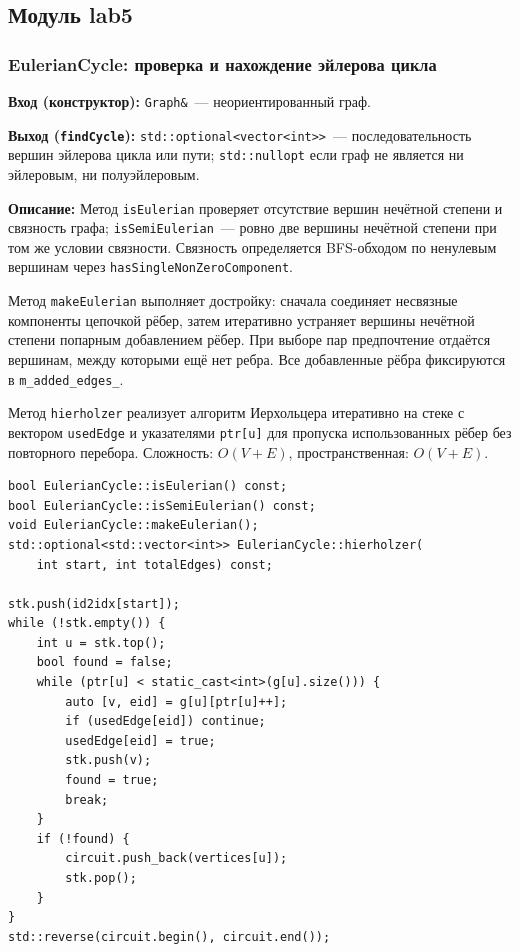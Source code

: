 \subsection{Модуль lab5}

\subsubsection{EulerianCycle: проверка и нахождение эйлерова цикла}

\textbf{Вход (конструктор):} \texttt{Graph\&}~--- неориентированный граф.

\textbf{Выход (\texttt{findCycle}):} \texttt{std::optional<vector<int>>}~---
последовательность вершин эйлерова цикла или пути;
\texttt{std::nullopt} если граф не является ни эйлеровым, ни полуэйлеровым.

\textbf{Описание:} Метод \texttt{isEulerian} проверяет отсутствие
вершин нечётной степени и связность графа; \texttt{isSemiEulerian}~---
ровно две вершины нечётной степени при том же условии связности.
Связность определяется BFS-обходом по ненулевым вершинам через
\texttt{hasSingleNonZeroComponent}.

Метод \texttt{makeEulerian} выполняет достройку: сначала соединяет
несвязные компоненты цепочкой рёбер, затем итеративно устраняет
вершины нечётной степени попарным добавлением рёбер. При выборе пар
предпочтение отдаётся вершинам, между которыми ещё нет ребра. Все
добавленные рёбра фиксируются в \texttt{m\_added\_edges\_}.

Метод \texttt{hierholzer} реализует алгоритм Иерхольцера итеративно
на стеке с вектором \texttt{usedEdge} и указателями \texttt{ptr[u]}
для пропуска использованных рёбер без повторного перебора.
Сложность: $O(V + E)$, пространственная: $O(V + E)$.

\begin{lstlisting}[style=cppstyle, caption={Достройка и алгоритм Иерхольцера (EulerianCycle.cc)}]
bool EulerianCycle::isEulerian() const;
bool EulerianCycle::isSemiEulerian() const;
void EulerianCycle::makeEulerian();
std::optional<std::vector<int>> EulerianCycle::hierholzer(
    int start, int totalEdges) const;

stk.push(id2idx[start]);
while (!stk.empty()) {
    int u = stk.top();
    bool found = false;
    while (ptr[u] < static_cast<int>(g[u].size())) {
        auto [v, eid] = g[u][ptr[u]++];
        if (usedEdge[eid]) continue;
        usedEdge[eid] = true;
        stk.push(v);
        found = true;
        break;
    }
    if (!found) {
        circuit.push_back(vertices[u]);
        stk.pop();
    }
}
std::reverse(circuit.begin(), circuit.end());
\end{lstlisting}

